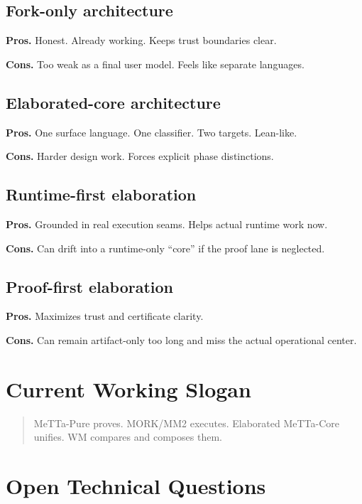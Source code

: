 \documentclass[11pt]{article}
\theoremstyle{remark}
\newcommand{\MeTTa}{\textup{MeTTa}}
\newcommand{\MORK}{\textup{MORK}}
\begin{document}
\subsection{Fork-only architecture}

\textbf{Pros.}
Honest. Already working. Keeps trust boundaries clear.

\textbf{Cons.}
Too weak as a final user model. Feels like separate languages.

\subsection{Elaborated-core architecture}

\textbf{Pros.}
One surface language. One classifier. Two targets. Lean-like.

\textbf{Cons.}
Harder design work. Forces explicit phase distinctions.

\subsection{Runtime-first elaboration}

\textbf{Pros.}
Grounded in real execution seams. Helps actual runtime work now.

\textbf{Cons.}
Can drift into a runtime-only ``core'' if the proof lane is neglected.

\subsection{Proof-first elaboration}

\textbf{Pros.}
Maximizes trust and certificate clarity.

\textbf{Cons.}
Can remain artifact-only too long and miss the actual operational center.

\section{Current Working Slogan}

\begin{quote}
\MeTTa-Pure proves. \MORK{}/MM2 executes. Elaborated \MeTTa-Core unifies.
WM compares and composes them.
\end{quote}

\section{Open Technical Questions}
\end{document}

